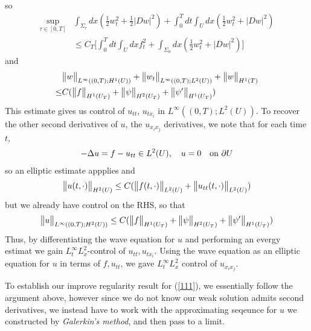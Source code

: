 \documentclass[12pt,a4paper]{report}
\begin{document}
so
\begin{align*}
\sup_{\tau\in [0,T]} & \int_{\Sigma_{\tau}}dx (\frac{1}{2}w_{t}^2 + \frac{1}{2}|Dw|^2) + \int_0^T dt \int_U dx (\frac{1}{2} w_t^2 + |Dw|^2)\\
& \leq C_T \Big[ \int_0^T dt \int_U dx f_t^2 + \int_{\Sigma_0}dx (\frac{1}{2}w_t^2 + |Dw|^2)\Big]
\end{align*}
and
\begin{align*}
& \bigl\lVert w\bigr\rVert_{L^{\infty}((0,T); H^1(U)) } + \bigl\lVert w_t\bigr\rVert_{L^{\infty}((0,T);L^2(U))}+ \bigl\lVert w\bigr\rVert_{H^1(T)}\\
\leq & C(\bigl\lVert f\bigr\rVert_{H^1(U_T)} + \bigl\lVert\psi\bigr\rVert_{H^2(U_T)}+\bigl\lVert\psi'\bigr\rVert_{H^1(U_T)})
\end{align*}
This estimate gives us control of $u_{tt}$, $u_{tx_i}$ in $L^{\infty}((0,T); L^2(U))$. To recover the other second derivatives of $u$, the $u_{x_i x_j}$ derivatives, we note that for each time $t$,
\begin{align*}
-\Delta u = f - u_{tt}\in L^2(U),\quad u=0 \quad \text{on }\partial U
\end{align*}
so an elliptic estimate appplies and
\begin{align*}
\bigl\lVert u(t, \cdot)\bigr\rVert_{H^2(U)}\leq C (\bigl\lVert f(t, \cdot)\bigr\rVert_{L^2(U)} + \bigl\lVert u_{tt}(t, \cdot)\bigr\rVert_{L^2(U)})
\end{align*}
but we already have control on the RHS, so that
\begin{align*}
\bigl\lVert u\bigr\rVert_{L^{\infty}((0, T); H^2(U))}\leq C(\bigl\lVert f\bigr\rVert_{H^1(U_T)} + \bigl\lVert\psi\bigr\rVert_{H^2(U_T)}+ \bigl\lVert\psi'\bigr\rVert_{H^1(U_T)})
\end{align*}
Thus, by differentiating the wave equation for $u$ and performing an evergy estimat we gain $L_t^{\infty}L_x^2$-control of $u_{tt}, u_{tx_i}$. Using the wave equation as an elliptic equation for $u$ in terms of $f, u_{tt}$, we gave $L_t^{\infty}L_x^{2}$ control of $u_{x_i x_j}$.
\s

\quad To establish our improve regularity result for (\ref{111}), we essentially follow the argument above, however since we do not know our weak solution admits second derivatives, we instead have to work with the approximating seqeunce for $u$ we constructed by \emph{Galerkin's method}, and then pass to a limit.
\s
\end{document}
